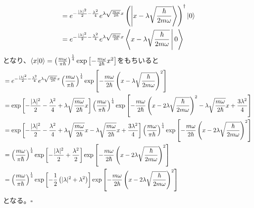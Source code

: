 \documentclass{jsarticle}  %
\numberwithin{equation}{section} %
\numberwithin{figure}{section}
\begin{document}
    \begin{align}
        &= e^{-\frac{|\lambda|^2}{2} -\frac{\lambda^2}{4} }e^{\lambda \sqrt{\frac{m\omega}{2\hbar }} x }\left(  \Ket{x - \lambda \sqrt{\frac{\hbar }{2m\omega}}} \right)^\dagger \ket{0} \notag \\
        &= e^{-\frac{|\lambda|^2}{2} -\frac{\lambda^2}{4} }e^{\lambda \sqrt{\frac{m\omega}{2\hbar }} x }\Braket{x - \lambda \sqrt{\frac{\hbar }{2m\omega}}|0} 
    \end{align}
    となり、$\braket{x|0} = \left( \frac{m\omega}{\pi \hbar} \right)^{\frac{1}{4}} \exp\left[ -\frac{m\omega}{2 \hbar}x^2 \right]$をもちいると
    \begin{align}
        &= e^{-\frac{|\lambda|^2}{2} -\frac{\lambda^2}{4} }e^{\lambda \sqrt{\frac{m\omega}{2\hbar }} x } \left( \frac{m\omega}{\pi \hbar} \right)^{\frac{1}{4}} \exp\left[ -\frac{m\omega}{2 \hbar}\left( x - \lambda \sqrt{\frac{\hbar }{2m\omega}} \right)^2 \right] \notag \\
        &= \exp \left[ -\frac{|\lambda|^2}{2} -\frac{\lambda^2}{4} + \lambda \sqrt{\frac{m\omega}{2\hbar }} x \right] \left( \frac{m\omega}{\pi \hbar} \right)^{\frac{1}{4}} \exp\left[ -\frac{m\omega}{2 \hbar}\left( x - 2\lambda \sqrt{\frac{\hbar }{2m\omega}} \right)^2 - \lambda \sqrt{\frac{m\omega}{2 \hbar }}x + \frac{3\lambda^2}{4}\right] \notag \\
        &= \exp \left[ -\frac{|\lambda|^2}{2} -\frac{\lambda^2}{4} + \lambda \sqrt{\frac{m\omega}{2\hbar }} x - \lambda \sqrt{\frac{m\omega}{2 \hbar }}x + \frac{3\lambda^2}{4}\right] \left( \frac{m\omega}{\pi \hbar} \right)^{\frac{1}{4}} \exp\left[ -\frac{m\omega}{2 \hbar}\left( x - 2\lambda \sqrt{\frac{\hbar }{2m\omega}} \right)^2 \right] \notag \\
        &=\left( \frac{m\omega}{\pi \hbar} \right)^{\frac{1}{4}} \exp \left[ -\frac{|\lambda|^2}{2} + \frac{\lambda^2}{2}\right]  \exp\left[ -\frac{m\omega}{2 \hbar}\left( x - 2\lambda \sqrt{\frac{\hbar }{2m\omega}} \right)^2 \right] \notag \\
        &=\left( \frac{m\omega}{\pi \hbar} \right)^{\frac{1}{4}} \exp \left[ -\frac{1}{2}\left( |\lambda|^2 + \lambda^2 \right)\right]  \exp\left[ -\frac{m\omega}{2 \hbar}\left( x - 2\lambda \sqrt{\frac{\hbar }{2m\omega}} \right)^2 \right]
    \end{align}
    となる。$\square$
\end{document}
